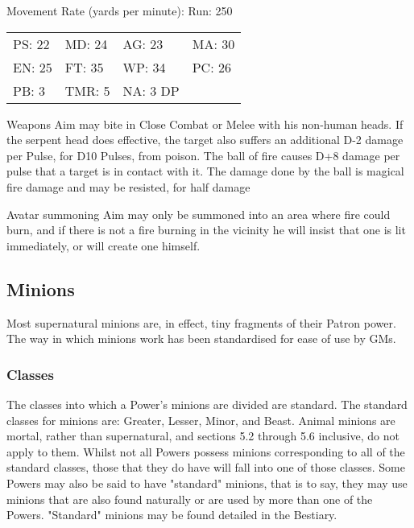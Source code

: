 \begin{example}
\begin{Description}
\item[Movement Rate] (yards per minute): Run: 250

\begin{tabular}{llll}
PS: 22	& MD: 24	& AG: 23	& MA: 30 \\
EN: 25	& FT: 35	& WP: 34	& PC: 26 \\
PB: 3 	& TMR: 5	& NA: 3 DP \\
\end{tabular}

\item[Weapons] Aim may bite in Close Combat or Melee with his non-human
heads. If the serpent head does effective, the target also suffers an
additional D-2 damage per Pulse, for D10 Pulses, from poison.  The
ball of fire causes D+8 damage per pulse that a target is in contact
with it. The damage done by the ball is magical fire damage and may be
resisted, for half damage

\item[Avatar summoning] Aim may only be summoned into an area where
fire could burn, and if there is not a fire burning in the vicinity he
will insist that one is lit immediately, or will create one himself.
\end{Description}
\end{example}


\subsection{Minions}

Most supernatural minions are, in effect, tiny fragments of their
Patron power. The way in which minions work has been standardised for
ease of use by GMs.

\subsubsection{Classes}

The classes into which a Power's minions are divided are standard.
The standard classes for minions are: Greater, Lesser, Minor, and
Beast.  Animal minions are mortal, rather than supernatural, and
sections 5.2 through 5.6 inclusive, do not apply to them.  Whilst not
all Powers possess minions corresponding to all of the standard
classes, those that they do have will fall into one of those classes.
Some Powers may also be said to have "standard" minions, that is to
say, they may use minions that are also found naturally or are used by
more than one of the Powers.  "Standard" minions may be found detailed
in the Bestiary.

